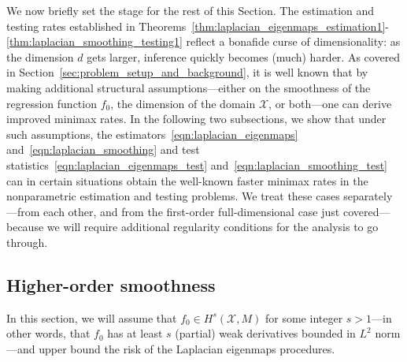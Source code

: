 \documentclass{article}
\newcommand{\1}{\mathbf{1}}
\newcommand{\Xset}{\mathcal{X}}
\newcommand{\Leb}{L}
\theoremstyle{alden}
\theoremstyle{aldenthm}
\theoremstyle{definition}
\theoremstyle{remark}
\begin{document}
We now briefly set the stage for the rest of this Section. The estimation and testing rates established in Theorems~\ref{thm:laplacian_eigenmaps_estimation1}-\ref{thm:laplacian_smoothing_testing1} reflect a bonafide curse of dimensionality: as the dimension $d$ gets larger, inference quickly becomes (much) harder. As covered in Section~\ref{sec:problem_setup_and_background}, it is well known that by making additional structural assumptions---either on the smoothness of the regression function $f_0$, the dimension of the domain $\Xset$, or both---one can derive improved minimax rates. In the following two subsections, we show that under such assumptions, the estimators~\eqref{eqn:laplacian_eigenmaps} and~\eqref{eqn:laplacian_smoothing} and test statistics~\eqref{eqn:laplacian_eigenmaps_test} and~\eqref{eqn:laplacian_smoothing_test} can in certain situations obtain the well-known faster minimax rates in the nonparametric estimation and testing problems. We treat these cases separately---from each other, and from the first-order full-dimensional case just covered---because we will require additional regularity conditions for the analysis to go through.

\subsection{Higher-order smoothness}
\label{subsec:minimax_higher_order_smoothness}

In this section, we will assume that $f_0 \in H^s(\Xset,M)$ for some integer $s > 1$---in other words, that $f_0$ has at least $s$ (partial) weak derivatives bounded in $\Leb^2$ norm---and upper bound the risk of the Laplacian eigenmaps procedures. 
\end{document}
